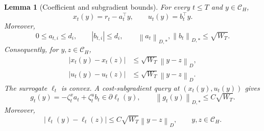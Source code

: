 \documentclass[11pt]{article}
\newtheorem{lemma}[theorem]{Lemma}
\newcommand{\CH}{\mathcal C_H}
\newcommand{\normD}[1]{\left\lVert #1\right\rVert_D}
\newcommand{\normDual}[1]{\left\lVert #1\right\rVert_{D,*}}
\begin{document}
\begin{lemma}[Coefficient and subgradient bounds]
\label{lem:features}
For every $t\le T$ and $y\in\CH$,
\begin{equation}
\label{eq:affine}
x_t(y)=r_t-a_t^\top y,
\qquad
u_t(y)=b_t^\top y.
\end{equation}
Moreover,
\begin{equation}
\label{eq:coefficient-bounds}
0\le a_{t,i}\le d_i,
\qquad
|b_{t,i}|\le d_i,
\qquad
\normDual{a_t},\normDual{b_t}\le\sqrt{W_T}.
\end{equation}
Consequently, for $y,z\in\CH$,
\begin{equation}
\label{eq:sensitivity}
\begin{aligned}
|x_t(y)-x_t(z)|&\le\sqrt{W_T}\normD{y-z},\\
|u_t(y)-u_t(z)|&\le\sqrt{W_T}\normD{y-z}.
\end{aligned}
\end{equation}
The surrogate $\ell_t$ is convex. A cost-subgradient query at
$(x_t(y),u_t(y))$ gives
\begin{equation}
\label{eq:gradient}
g_t(y)=-\zeta_t^x a_t+\zeta_t^u b_t
\in\partial\ell_t(y),
\qquad
\normDual{g_t(y)}\le C\sqrt{W_T}.
\end{equation}
Moreover,
\begin{equation}
\label{eq:surrogate-lipschitz}
|\ell_t(y)-\ell_t(z)|
\le C\sqrt{W_T}\normD{y-z},
\qquad y,z\in\CH.
\end{equation}
\end{lemma}
\end{document}

